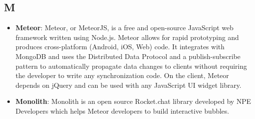\subsection*{M}
\begin{itemize}
	\item
	\textbf{Meteor}: Meteor, or MeteorJS, is a free and open-source JavaScript web framework written using Node.js. Meteor allows for rapid prototyping and produces cross-platform (Android, iOS, Web) code. It integrates with MongoDB and uses the Distributed Data Protocol and a publish-subscribe pattern to automatically propagate data changes to clients without requiring the developer to write any synchronization code. On the client, Meteor depends on jQuery and can be used with any JavaScript UI widget library.
	\item
	\textbf{Monolith}: Monolith is an open source Rocket.chat library developed by NPE Developers which helps Meteor developers to build interactive bubbles.
\end{itemize}
\newpage